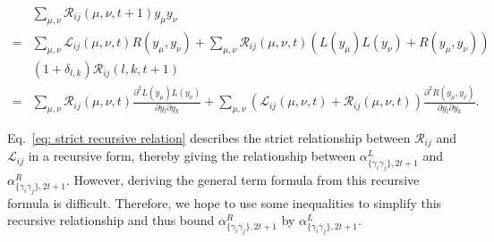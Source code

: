 \documentclass[journal=jctcce,a4paper,manuscript=article]{achemso}
\newcommand{\alpl}{\alpha_{\{\gamma_i\gamma_j\}, 2t+1}^{L}}
\newcommand{\alpr}{\alpha_{\{\gamma_i\gamma_j\}, 2t+1}^{R}}
\begin{document}
\begin{align}
    & \sum_{\mu,\nu} \mathscr{R}_{ij} (\mu, \nu, t+1) y_\mu y_\nu                                                                                                                                                                                                            \\
  = & \sum_{\mu,\nu}\mathscr{L}_{ij} (\mu, \nu, t) R(y_\mu, y_\nu) + \sum_{\mu,\nu}\mathscr{R}_{ij} (\mu, \nu, t) (L(y_\mu) L(y_\nu) + R(y_\mu, y_\nu))                                                                                                                      \\
    & (1+ \delta_{l,k})  \mathscr{R}_{ij} (l, k, t+1)                                                                                                                                                                                                                        \\
  = & \sum_{\mu,\nu}\mathscr{R}_{ij} (\mu, \nu, t) \frac{\partial^2L(y_\mu) L(y_\nu)}{\partial y_l \partial y_k} + \sum_{\mu,\nu}\left( \mathscr{L}_{ij} (\mu, \nu, t) + \mathscr{R}_{ij} (\mu, \nu, t) \right)\frac{\partial^2 R(y_\mu, y_\nu)}{\partial y_l \partial y_k}.
  \label{eq: strict recursive relation}
\end{align}

Eq.~\eqref{eq: strict recursive relation} describes the strict relationship
between $\mathscr{R}_{ij}$ and $\mathscr{L}_{ij}$ in a recursive form, thereby
giving the relationship between $\alpl$ and $\alpr$. However, deriving the
general term formula from this recursive formula is difficult. Therefore, we
hope to use some inequalities to simplify this recursive relationship and thus
bound $\alpr$ by $\alpl$.
\end{document}
